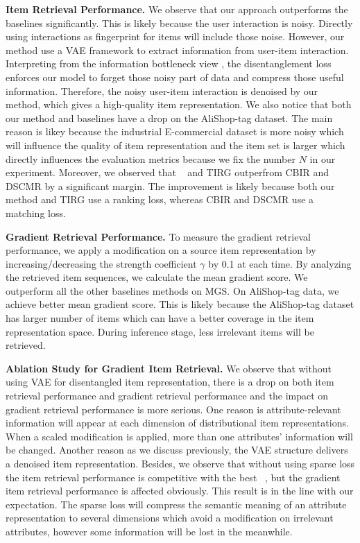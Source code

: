 \textbf{Item Retrieval Performance.} We observe that our approach outperforms the baselines significantly. This is likely because the user interaction is noisy. Directly using interactions as fingerprint for items will include those noise. However, our method use a VAE \cite{ChenB20PairwiseVAE} framework to extract information from user-item interaction. Interpreting from the information bottleneck view \cite{TishbyZ15DLIB}, the disentanglement loss enforces our model to forget those noisy part of data and compress those useful information. Therefore, the noisy user-item interaction is denoised by our method, which gives a high-quality item representation. We also notice that both our method and baselines have a drop on the AliShop-tag dataset. The main reason is likey because the industrial E-commercial dataset is more noisy which will influence the quality of item representation and the item set is larger which directly influences the evaluation metrics because we fix the number $N$ in our experiment. Moreover, we observed that \CGIR~ and TIRG outperfrom CBIR and DSCMR by a significant margin. The improvement is likely because both our method and TIRG use a ranking loss, whereas CBIR and DSCMR use a matching loss.



\textbf{Gradient Retrieval Performance.} To measure the gradient retrieval performance, we apply a modification on a source item representation by increasing/decreasing the strength coefficient $\gamma$ by 0.1 at each time. By analyzing the retrieved item sequences, we calculate the mean gradient score. We outperform all the other baselines methods on MGS. On AliShop-tag data, we achieve better mean gradient score. This is likely because the AliShop-tag dataset has larger number of items which can have a better coverage in the item representation space. During inference stage, less irrelevant items will be retrieved.

\textbf{Ablation Study for Gradient Item Retrieval.} We observe that without using VAE for disentangled item representation, there is a drop on both item retrieval performance and gradient retrieval performance and the impact on gradient retrieval performance is more serious. One reason is attribute-relevant information will appear at each dimension of distributional item representations. When a scaled modification is applied, more than one attributes' information will be changed. Another reason as we discuss previously, the VAE structure delivers a denoised item representation. Besides, we observe that without using sparse loss the item retrieval performance is competitive with the best \CGIR~, but the gradient item retrieval performance is affected obviously. This result is in the line with our expectation. The sparse loss will compress the semantic meaning of an attribute representation to several dimensions which avoid a modification on irrelevant attributes, however some information will be lost in the meanwhile.


